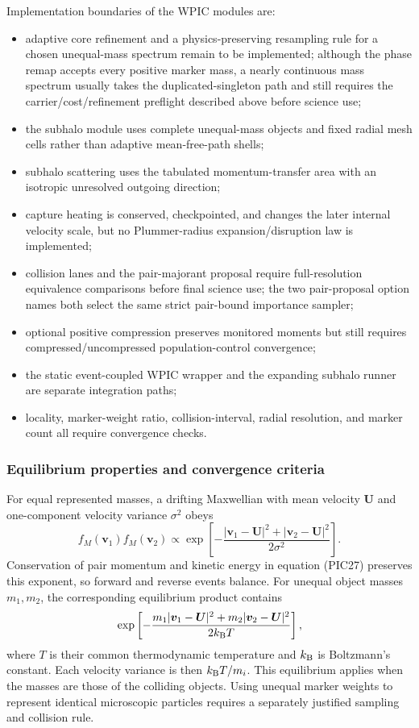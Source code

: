 Implementation boundaries of the WPIC modules are:
\begin{itemize}
\item adaptive core refinement and a physics-preserving resampling rule for a
chosen unequal-mass spectrum remain to be implemented; although the phase
remap accepts every positive marker mass, a nearly continuous mass spectrum
usually takes the duplicated-singleton path and still requires the
carrier/cost/refinement preflight described above before science use;
\item the subhalo module uses complete unequal-mass objects and fixed radial
mesh cells rather than adaptive mean-free-path shells;
\item subhalo scattering uses the tabulated momentum-transfer area with an
isotropic unresolved outgoing direction;
\item capture heating is conserved, checkpointed, and changes the later
internal velocity scale, but no Plummer-radius expansion/disruption law is
implemented;
\item collision lanes and the pair-majorant proposal require
full-resolution equivalence comparisons before final science use; the two
pair-proposal option names both select the same strict pair-bound
importance sampler;
\item optional positive compression preserves monitored moments but still
requires compressed/uncompressed population-control convergence;
\item the static event-coupled WPIC wrapper and the expanding subhalo runner
are separate integration paths;
\item locality, marker-weight ratio, collision-interval, radial resolution,
and marker count all require convergence checks.
\end{itemize}

\subsubsection{Equilibrium properties and convergence criteria}

For equal represented masses, a drifting Maxwellian with mean velocity
\(\bm U\) and one-component velocity variance \(\sigma^2\) obeys
\[
 f_M(\bm v_1)f_M(\bm v_2)\propto
 \exp\left[-\frac{|\bm v_1-\bm U|^2+|\bm v_2-\bm U|^2}
 {2\sigma^2}\right]. \tag{PIC35M}
\]
Conservation of pair momentum and kinetic energy in equation (PIC27)
preserves this exponent, so forward and reverse events balance.  For unequal
object masses \(m_1,m_2\), the corresponding equilibrium product contains
\[
 \exp\left[-\frac{m_1|\bm v_1-\bm U|^2+
                       m_2|\bm v_2-\bm U|^2}{2k_{\rm B}T}\right],
\]
where \(T\) is their common thermodynamic temperature and \(k_{\rm B}\) is
Boltzmann's constant.  Each velocity variance is then \(k_{\rm B}T/m_i\).
This equilibrium applies when the masses are those of the colliding objects.
Using unequal marker weights to represent identical microscopic particles
requires a separately justified sampling and collision rule.


